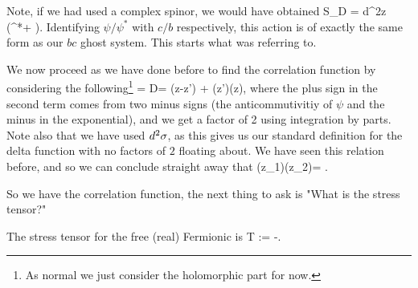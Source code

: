 \br 
\label{rem:DiracDone}
    Note, if we had used a complex spinor, we would have obtained 
    \bse 
        S_D =  \int d^2z \big(\psi^*\overline{\p}\psi + \overline{\psi^*}\p\overline{\psi}\big).
    \ese 
    Identifying $\psi/\psi^*$ with $c/b$ respectively, this action is of exactly the same form as our $bc$ ghost system. This starts what  was referring to.
\er 

We now proceed as we have done before to find the correlation function by considering the following\footnote{As normal we just consider the holomorphic part for now.}
 = \int D\psi {} = \del(z-z') +  \big\la \psi(z')\overline{\p}\psi(z)\big\ra,
\ese
where the plus sign in the second term comes from two minus signs (the anticommutivitiy of $\psi$ and the minus in the exponential), and we get a factor of 2 using integration by parts. Note also that we have used $d^2\sigma$, as this gives us our standard definition for the delta function with no factors of $2$ floating about. We have seen this relation before, and so we can conclude straight away that 
\be 
\label{eqn:PsiCorrelation}
    \big\la \psi(z_1)\psi(z_2)\big\ra = .
\ee 

So we have the correlation function, the next thing to ask is "What is the stress tensor?"

\bcl 
    The stress tensor for the free (real) Fermionic is 
    \be 
    \label{eqn:FreeFermionicStressTensor}
        T := -\cl \psi\p\psi\cl .
    \ee 
\ecl 

